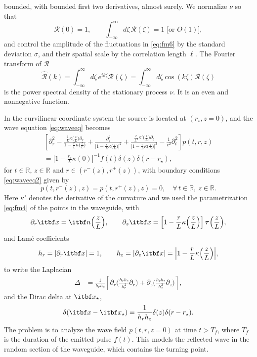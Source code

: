 \documentclass[final]{siamltex}
\begin{document}
bounded, with bounded first two derivatives, almost surely. We
normalize $\nu$ so that
\begin{equation}
{\mathcal{R}}(0) = 1, \qquad \int_{-\infty}^\infty d \zeta \, {\mathcal{R}}(\zeta) = 1 \mbox{ [or  $O(1)$]} ,
\end{equation} 
and control the amplitude of the fluctuations in \eqref{eq:fm6} by
the standard deviation $\sigma$, and their spatial scale  by the correlation length 
$\ell$.
The Fourier transform of ${\mathcal{R}}$
$$
\widehat{\mathcal{R}}(k) = \int_{-\infty}^\infty d\zeta \, e^{i k \zeta} {\mathcal{R}}(\zeta) = \int_{-\infty}^\infty d\zeta \cos ( k \zeta) {\mathcal{R}}(\zeta) 
$$
is the power spectral density of the stationary process $\nu$. It is an even and  nonnegative function.

In the curvilinear coordinate system the source is located at
$(r_\star, z=0)$, and the wave equation \eqref{eq:waveeq} becomes
\begin{align}
\left[\partial_r^2 -
  \frac{\frac{1}{L}\kappa\big(\frac{z}{L}\big)\partial_r}{1 -
    \frac{r}{L} \kappa\big(\frac{z}{L}\big)} +
  \frac{\partial_z^2}{\Big[ 1 - \frac{r}{L}
      \kappa\big(\frac{z}{L}\big)\Big]^2} + \frac{\frac{r}{L^2}
    \kappa'\big(\frac{z}{L}\big)\partial_z}{\Big[ 1 - \frac{r}{L}
      \kappa\big(\frac{z}{L}\big)\Big]^3} - \frac{1}{c^2} \partial_t^2
  \right] p(t,r,z) \nonumber \\= \left|1 - \frac{r_\star}{L}
\kappa(0)\right|^{-1} f(t)\delta(z) \delta(r-r_\star),\label{eq:fm7}
\end{align}
for $t \in {\mathbb{R}}$, $z \in {\mathbb{R}}$ and $r \in (r^-(z),r^+(z))$, with boundary
conditions \eqref{eq:waveeq2} given by
\begin{equation}
p(t,r^-(z),z) = p(t,r^+(z),z) = 0, \quad \forall \, t  \in {\mathbb{R}} , ~  z \in {\mathbb{R}}.
\label{eq:fm8}
\end{equation}
Here $\kappa'$ denotes the derivative of the curvature and we used the
parametrization \eqref{eq:fm4} of the points in the waveguide, with
\begin{equation*}
\partial_r {{{\itbf x}}} = {{{\itbf n}}}\Big(\frac{z}{L}\Big), \qquad \partial_z {{{\itbf x}}} =
\left[ 1 - \frac{r}{L} \kappa\Big(\frac{z}{L}\Big)
  \right]{{\bm{\tau}}}\Big(\frac{z}{L}\Big),
\end{equation*}
and Lam\'{e} coefficients
\begin{equation*}
h_r = |\partial_r {{{\itbf x}}}| = 1, \qquad h_z = |\partial_z {{{\itbf x}}}| = \Big|1 - 
\frac{r}{L} \kappa\Big(\frac{z}{L}\Big)\Big|,
\end{equation*}
to write the  Laplacian
\begin{align*}
\Delta &= \frac{1}{h_r h_z} \left[ \partial_r \Big( \frac{h_r
    h_z}{h_r^2} \partial_r \Big) + \partial_z \Big( \frac{h_r
    h_z}{h_z^2} \partial_z \Big)\right],
\end{align*}
and the Dirac delta at ${{{\itbf x}}}_\star$, 
\[
\delta({{{\itbf x}}}-{{{\itbf x}}}_\star) = \frac{1}{h_r h_z} \delta(z) \delta(r-r_\star).
\]
The problem is to analyze the wave field $p(t,r,z=0)$ at time $t >
T_f$, where $T_f$ is the duration of the emitted pulse $f(t)$. This
models the reflected wave in the random section of the waveguide,
which contains the turning point.
\end{document}
